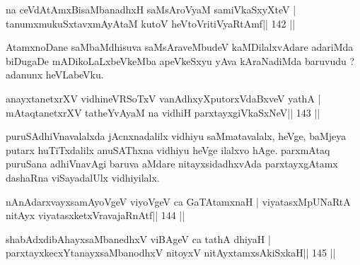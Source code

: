 \begin{shl}
na ceVdAtAmxBisaMbanadhxH saMsAroV\s yaM samiVkaSxyXteV |
tanumxmukuSxtavxmAyAtaM kutoV heVtoVritiVyaRtAmf\hfill || 142 ||
\end{shl}

\begin{artha}
AtamxnoDane saMbaMdhisuva saMsAraveMbudeV kaMDilalxvAdare adariMda biDugaDe mADikoLaLxbeVkeMba apeVkeSxyu yAva kAraNadiMda baruvudu ? adanunx heVLabeVku.
\end{artha}


\begin{shl}
anayxtanetxrXV vidhineVRSoTxV vanAdhxyXputorxVdaBxveV yathA |
mAtaqtanetxrXV tatheYvAyaM na vidhiH parxtayxgiVkaSxNeV\hfill || 143 ||
\end{shl}

\begin{artha}
puruSAdhiVnavalalxda jAcnxnadalilx vidhiyu saMmatavalalx, heVge, baMjeya putarx huTiTxdalilx anuSAThxna vidhiyu heVge ilalxvo hAge. parxmAtaq puruSana adhiVnavAgi baruva aMdare nitayxsidadhxvAda parxtayxgAtamx dashaRna viSayadalUlx vidhiyilalx.
\end{artha}


\begin{shl}
\footnotemark[1]nAnAdarxvayxsamAyoVgeV viyoVgeV ca GaTAtamxnaH |
viyatasxMpUNaRtA nitAyx viyatasxketxVravajaRnAtf\hfill || 144 ||
\end{shl}

\begin{shl}
\footnotemark[2]shabAdxdibAhayxsaMbanedhxV viBAgeV ca tathA dhiyaH |
parxtayxkecxYtanayxsaMbanodhxV nitoyxV nitAyxtamxsAkiSxkaH\hfill || 145 ||
\end{shl}

